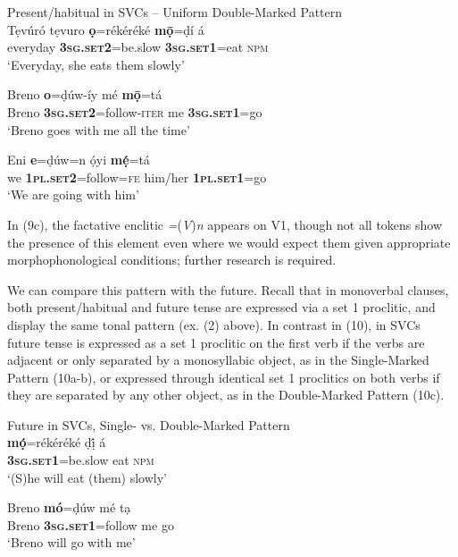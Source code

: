 \documentclass[output=paper]{langsci/langscibook}
\begin{document}
\ea
{Present/habitual in SVCs – Uniform Double-Marked Pattern}\\
\gll   Tẹvúró tẹvuro  \textbf{ọ}=rékéréké       \textbf{m\={o}̣}=ḍí       á\\ 
       everyday     \textbf{\textsc{3sg.set2}}=be.slow  \textbf{\textsc{3sg.set1}}=eat  \textsc{npm}\\
\glt ‘Everyday, she eats them slowly’ 
\z




\ea
\gll   Breno   \textbf{o}=ḍúw-íy         mé   \textbf{m\={o}̣}=tá\\ 
       Breno   \textbf{\textsc{3sg.set2}}=follow-\textsc{iter  }me   \textbf{3}\textbf{\textsc{sg.set1}}\textsc{=}go\\
\glt ‘Breno goes with me all the time’
\z




\ea
\gll   Eni   \textbf{e}=ḍúw=n       ọ́yi       \textbf{mẹ́}=tá\\ 
       we   \textbf{\textsc{1pl.set2}}=follow=\textsc{fe}   him/her    \textbf{\textsc{1pl.set1}}=go\\
\glt ‘We are going with him’
\z

In (9c), the factative enclitic \textit{=}(\textit{V})\textit{n} appears on V1, though not all tokens show the presence of this element even where we would expect them given appropriate morphophonological conditions; further research is required. 

  We can compare this pattern with the future. Recall that in monoverbal clauses, both present/habitual and future tense are expressed via a set 1 proclitic, and display the same tonal pattern (ex. (2) above). In contrast in (10), in SVCs future tense is expressed as a set 1 proclitic on the first verb if the verbs are adjacent or only separated by a monosyllabic object, as in the Single-Marked Pattern (10a-b), or expressed through identical set 1 proclitics on both verbs if they are separated by any other object, as in the Double-Marked Pattern (10c). 

\label{bkm:Ref453836224}


{Future in SVCs, Single- vs. Double-Marked Pattern}\\
\ea
\gll   \textbf{mọ́}=rékéréké     ḍị́   á\\ 
       \textbf{\textsc{3sg.set1}}=be.slow   eat   \textsc{npm}\\
\glt ‘(S)he will eat (them) slowly’ 
\z




\ea
\gll   Breno  \textbf{mó}=ḍúw       mé   tạ\\ 
       Breno   \textbf{\textsc{3sg.set1}}=follow    me  go\\
\glt ‘Breno will go with me’
\z
\end{document}
